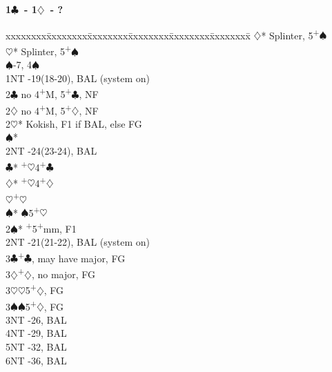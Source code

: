 \documentclass[10pt]{article}
\renewcommand{\c}{$\clubsuit$}
\renewcommand{\d}{$\diamondsuit$}
\newcommand{\h}{$\heartsuit$}
\newcommand{\s}{$\spadesuit$}
\newcommand{\p}{\textsuperscript{+}}
\newenvironment{bidtable}[1][]
{\textbf{#1}
  \begin{adjustwidth}{1em}{}
    \addvspace{2pt}
    \begin{tabbing}
      xxxxxxxx\=xxxxxxxx\=xxxxxxxx\=xxxxxxxx\=xxxxxxxx\=xxxxxxxx\=\kill}
{\end{tabbing}\end{adjustwidth}\bigskip}%
\begin{document}
\begin{multicols*}{2}
\begin{bidtable}[1\c\ - 1\d\ - ?]
     \d* \> Splinter, 5\p\s                    \\
     \h* \> Splinter, 5\p\s                    \\
     \s  {}-7, 4\s                           \\
1NT  -19(18-20), BAL (system on)              \\
2\c  \> no 4\p M, 5\p\c, NF                        \\
2\d  \> no 4\p M, 5\p\d, NF                        \\
2\h* \> Kokish, F1 if BAL, else FG                                \\
     \s* \>                                    \\
     \>      \> 2NT      -24(23-24), BAL      \\
     \>      \c*     {}\p\h 4\p\c            \\
     \>      \d*     {}\p\h 4\p\d            \\
     \>      \h      {}\p\h                  \\
     \>      \s*     {}\s 5\p\h              \\
2\s* {}\p 5\p mm, F1                             \\
2NT  -21(21-22), BAL (system on)              \\
3\c  {}\p\c, may have major, FG                  \\
3\d  {}\p\d, no major, FG                        \\
3\h  {}\h 5\p\d, FG                              \\
3\s  {}\s 5\p\d, FG                              \\
3NT  -26, BAL                                 \\
4NT  -29, BAL                                 \\
5NT  -32, BAL                                 \\
6NT  -36, BAL
\end{bidtable}


\end{multicols*}
\end{document}
